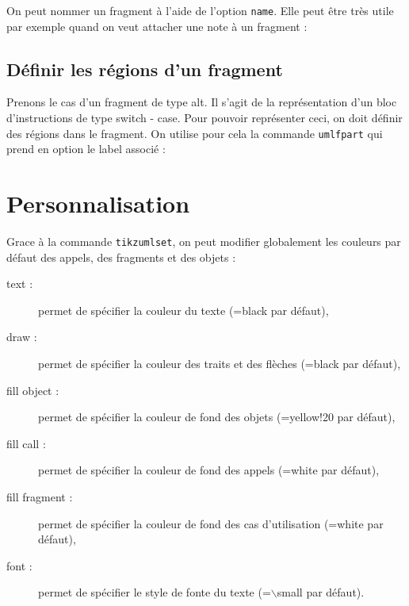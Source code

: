 \documentclass[a4paper,11pt]{report}
\newcommand{\inputTikZ}[1]{%
  }%
\newcommand{\inputTikZ}[1]{%
    \texttt{[image: fig/\#1.pdf]}%
  }%
\begin{document}
On peut nommer un fragment à l'aide de l'option {\tt name}. Elle peut être très utile par exemple quand on veut attacher une note à un fragment :

\medskip

\begin{minipage}{0.5\textwidth}

\end{minipage}
\begin{minipage}{0.5\textwidth}
\begin{center}
\inputTikZ{fragmentname}
\end{center}
\end{minipage}

\subsection{Définir les régions d'un fragment}\label{ss.fragpart}

Prenons le cas d'un fragment de type alt. Il s'agit de la représentation d'un bloc d'instructions de type switch - case. Pour pouvoir représenter ceci, on doit définir des régions dans le fragment. On utilise pour cela la commande {\tt umlfpart} qui prend en option le label associé :

\medskip

\begin{minipage}{0.5\textwidth}

\end{minipage}
\begin{minipage}{0.5\textwidth}
\begin{center}
\inputTikZ{fragmentpart}
\end{center}
\end{minipage}

\section{Personnalisation}\label{s.fitseq}

Grace à la commande {\tt tikzumlset}, on peut modifier globalement les couleurs par défaut des appels, des fragments et des objets :

\begin{description}
\item[text :] permet de spécifier la couleur du texte (=black par défaut),
\item[draw :] permet de spécifier la couleur des traits et des flèches (=black par défaut),
\item[fill object :] permet de spécifier la couleur de fond des objets (=yellow!20 par défaut),
\item[fill call :] permet de spécifier la couleur de fond des appels (=white par défaut),
\item[fill fragment :] permet de spécifier la couleur de fond des cas d'utilisation (=white par défaut),
\item[font :] permet de spécifier le style de fonte du texte (=$\backslash$small par défaut).
\end{description}
\end{document}
